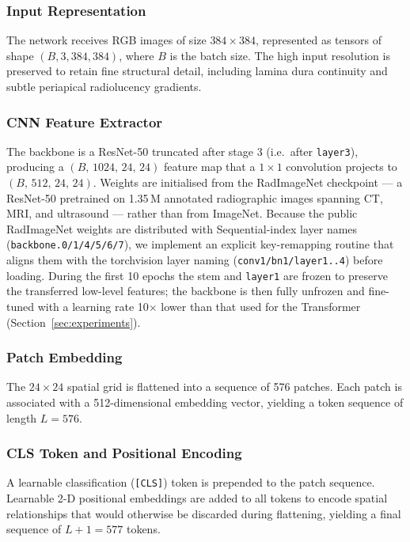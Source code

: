 \documentclass[conference]{IEEEtran}
\begin{document}
\subsubsection{Input Representation}
The network receives RGB images of size $384\times384$, represented as tensors
of shape $(B,3,384,384)$, where $B$ is the batch size. The high input
resolution is preserved to retain fine structural detail, including lamina dura
continuity and subtle periapical radiolucency gradients.

\subsubsection{CNN Feature Extractor}
The backbone is a ResNet-50 \cite{he2016} truncated after stage 3 (i.e.\
after \texttt{layer3}), producing a $(B,\,1024,\,24,\,24)$ feature map that a
$1\!\times\!1$ convolution projects to $(B,\,512,\,24,\,24)$. Weights are
initialised from the RadImageNet checkpoint \cite{mei2022radimagenet} --- a
ResNet-50 pretrained on 1.35\,M annotated radiographic images spanning CT,
MRI, and ultrasound --- rather than from ImageNet. Because the public
RadImageNet weights are distributed with Sequential-index layer names
(\texttt{backbone.0/1/4/5/6/7}), we implement an explicit key-remapping
routine that aligns them with the torchvision layer naming
(\texttt{conv1/bn1/layer1..4}) before loading. During the first 10 epochs
the stem and \texttt{layer1} are frozen to preserve the transferred
low-level features; the backbone is then fully unfrozen and fine-tuned with
a learning rate 10$\times$ lower than that used for the Transformer
(Section~\ref{sec:experiments}).

\subsubsection{Patch Embedding}
The $24\times24$ spatial grid is flattened into a sequence of 576 patches.
Each patch is associated with a 512-dimensional embedding vector, yielding a
token sequence of length $L = 576$.

\subsubsection{CLS Token and Positional Encoding}
A learnable classification (\texttt{[CLS]}) token is prepended to the patch
sequence. Learnable 2-D positional embeddings are added to all tokens to
encode spatial relationships that would otherwise be discarded during
flattening, yielding a final sequence of $L+1 = 577$ tokens.
\end{document}
